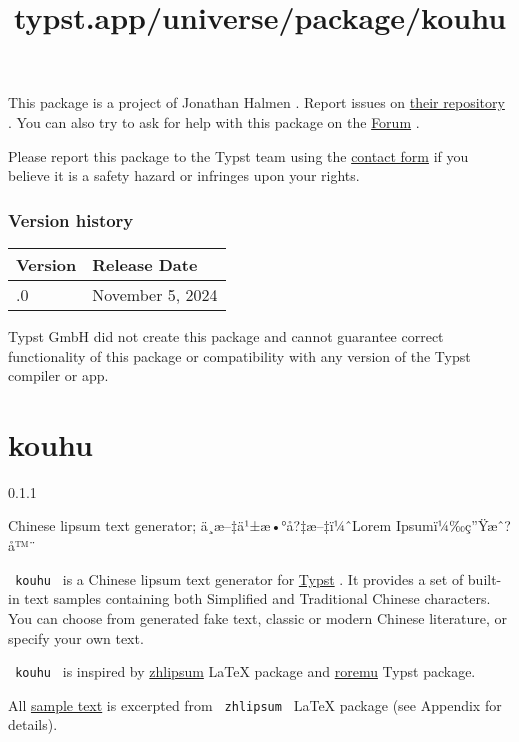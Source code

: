 This package is a project of Jonathan Halmen . Report issues on
\href{https://git.sr.ht/~slowjo/typst-abbr}{their repository} . You can
also try to ask for help with this package on the
\href{https://forum.typst.app}{Forum} .

Please report this package to the Typst team using the
\href{https://typst.app/contact}{contact form} if you believe it is a
safety hazard or infringes upon your rights.

\label{versions}
\subsubsection{Version history}\label{version-history}

\begin{longtable}[]{@{}ll@{}}
\toprule\noalign{}
Version & Release Date \\
\midrule\noalign{}
\endhead
\bottomrule\noalign{}
\endlastfoot
0.1.0 & November 5, 2024 \\
\end{longtable}

Typst GmbH did not create this package and cannot guarantee correct
functionality of this package or compatibility with any version of the
Typst compiler or app.


\title{typst.app/universe/package/kouhu}

\label{banner}
\section{kouhu}\label{kouhu}

{ 0.1.1 }

Chinese lipsum text generator; ä¸­æ--‡ä¹±æ•°å?‡æ--‡ï¼ˆLorem
Ipsumï¼‰ç''Ÿæˆ?å™¨

\label{readme}
\texttt{\ kouhu\ } is a Chinese lipsum text generator for
\href{https://typst.app/}{Typst} . It provides a set of built-in text
samples containing both Simplified and Traditional Chinese characters.
You can choose from generated fake text, classic or modern Chinese
literature, or specify your own text.

\texttt{\ kouhu\ } is inspired by
\href{https://ctan.org/pkg/zhlipsum}{zhlipsum} LaTeX package and
\href{https://typst.app/universe/package/roremu}{roremu} Typst package.

All
\href{https://github.com/typst/packages/raw/main/packages/preview/kouhu/0.1.1/data/zhlipsum.json}{sample
text} is excerpted from \texttt{\ zhlipsum\ } LaTeX package (see
Appendix for details).

